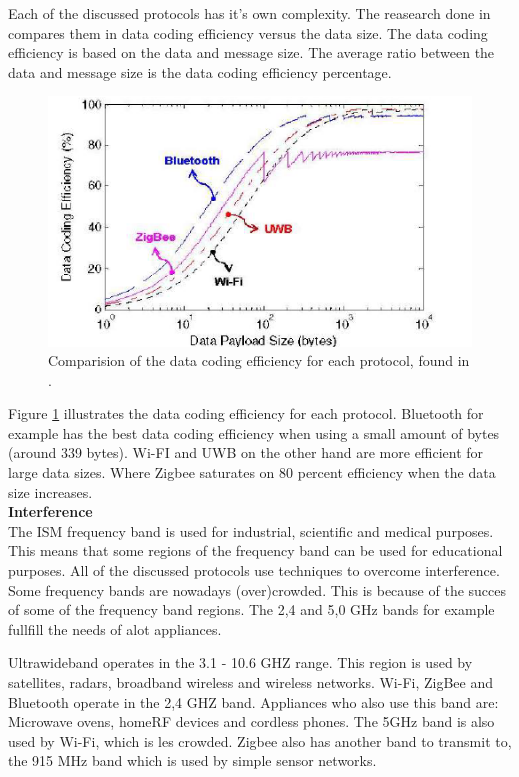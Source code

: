 \documentclass[10pt,a4paper]{article}
\begin{document}
Each of the discussed protocols has it's own complexity. The reasearch done in \cite{comparitivestudywirelessprotocols} compares them in data coding efficiency versus the data size. The data coding efficiency is based on the data and message size. The average ratio between the data and message size is the data coding efficiency percentage. 

\begin{figure}[H]
   \centering
   \includegraphics[width=1\textwidth]{datacodingefficieny}
   \caption{Comparision of the data coding efficiency for each protocol, found in \cite{comparitivestudywirelessprotocols}.}
   \label{fig:protocolefficiency}
\end{figure}

Figure \ref{fig:protocolefficiency} illustrates the data coding efficiency for each protocol. Bluetooth for example has the best data coding efficiency when using a small amount of bytes (around 339 bytes). Wi-FI and UWB on the other hand are more efficient for large data sizes. Where Zigbee saturates on 80 percent efficiency when the data size increases.\\

\textbf{Interference}\\
The ISM frequency band is used for industrial, scientific and medical purposes. This means that some regions of the frequency band can be used for educational purposes. All of the discussed protocols use techniques to overcome interference. Some frequency bands are nowadays (over)crowded. This is because of the succes of some of the frequency band regions. \cite{Bluetoothwifisurveyandcomparison} The 2,4 and 5,0 GHz bands for example fullfill the needs of alot appliances.

Ultrawideband operates in the 3.1 - 10.6 GHZ range. This region is used by satellites, radars, broadband wireless and wireless networks. Wi-Fi, ZigBee and Bluetooth operate in the 2,4 GHZ band. Appliances who also use this band are: Microwave ovens, homeRF devices and cordless phones. The 5GHz band is also used by Wi-Fi, which is les crowded. Zigbee also has another band to transmit to, the 915 MHz band which is used by simple sensor networks.
\end{document}
